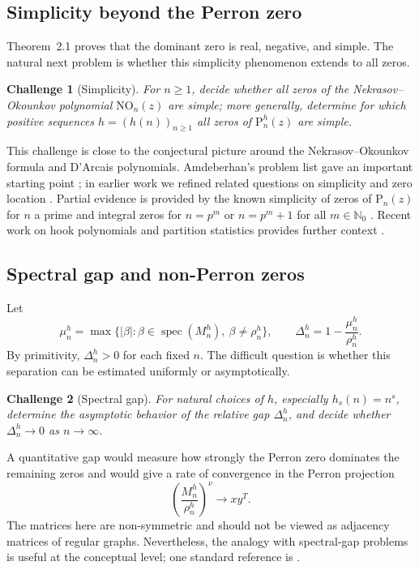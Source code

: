 \documentclass[11pt,reqno]{amsart}
\theoremstyle{plain}
\newtheorem{challenge}{Challenge}
\theoremstyle{remark}
\theoremstyle{definition}
\numberwithin{equation}{section}
\newcommand{\Mnhexp}{\nu }
\newcommand{\nop}{\mathrm{NO}}
\newcommand{\pol}{\mathrm{P}}
\newcommand{\spektral}{\Delta }
\begin{document}
\subsection{Simplicity beyond the Perron zero}

Theorem~2.1 proves that the dominant zero is real, negative, and simple. The natural next problem is whether this simplicity phenomenon extends to all zeros.

\begin{challenge}[Simplicity]
For $n\geq 1$, decide whether all zeros of the Nekrasov--Okounkov polynomial $\nop _n(z)$ are simple; more generally, determine for which positive sequences $h=(h(n))_{n\geq 1}$ all zeros of $\pol _n^h(z)$ are simple.
\end{challenge}

This challenge is close to the conjectural picture around the Nekrasov--Okounkov formula and D'Arcais polynomials. Amdeberhan's problem list gave an important starting point \cite{Am15}; in earlier work we refined related questions on simplicity and zero location \cite{HN19}. Partial evidence is provided by the known simplicity of
 zeros of $\pol _{n}\left( z
 \right) $ for $n$ a prime \cite{HN26} and integral zeros for
 $n=p^m$ or $n=p^m+1$ for all $m \in \mathbb{N}_0$ \cite{HN18}. Recent work on hook polynomials and partition statistics provides further context \cite{BCFR25}.

\subsection{Spectral gap and non-Perron zeros}

Let
\[
\mu_n^h=\max\{ |\beta|:\beta\in\operatorname{spec}(M_n^h),\ \beta\neq \rho_n^h\},\qquad
\spektral _n^h=1-\frac{\mu_n^h}{\rho_n^h}.
\]
By primitivity, $\spektral _n^h>0$ for each fixed $n$. The difficult question is whether this separation can be estimated uniformly or asymptotically.

\begin{challenge}[Spectral gap]
For natural choices of $h$, especially $h_s(n)=n^s$, determine the asymptotic behavior of the relative gap $\spektral _n^h$, and decide whether $\spektral _n^h\to 0$ as $n\to\infty$.
\end{challenge}

A quantitative gap would measure how strongly the Perron zero dominates the remaining zeros and would give a rate of convergence in the Perron projection
\[
\left(\frac{M_n^h}{\rho_n^h}\right) ^{\Mnhexp }
\longrightarrow xy^T .
\]
The matrices here are non-symmetric and should not be viewed as adjacency matrices of regular graphs. Nevertheless, the analogy with spectral-gap problems is useful at the conceptual level; one standard reference is \cite{DSV03}. 
\end{document}
